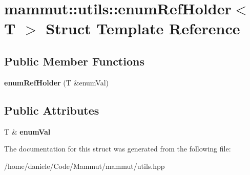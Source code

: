 \hypertarget{structmammut_1_1utils_1_1enumRefHolder}{\section{mammut\-:\-:utils\-:\-:enum\-Ref\-Holder$<$ T $>$ Struct Template Reference}
\label{structmammut_1_1utils_1_1enumRefHolder}
}
\subsection*{Public Member Functions}
\begin{DoxyCompactItemize}
\item 
\hypertarget{structmammut_1_1utils_1_1enumRefHolder_a767ffb8c1927f89e40ad83fb07e81029}{{\bfseries enum\-Ref\-Holder} (T \&enum\-Val)}\label{structmammut_1_1utils_1_1enumRefHolder_a767ffb8c1927f89e40ad83fb07e81029}

\end{DoxyCompactItemize}
\subsection*{Public Attributes}
\begin{DoxyCompactItemize}
\item 
\hypertarget{structmammut_1_1utils_1_1enumRefHolder_ae4f40e4a23be3930a6bee62240a8ffc6}{T \& {\bfseries enum\-Val}}\label{structmammut_1_1utils_1_1enumRefHolder_ae4f40e4a23be3930a6bee62240a8ffc6}

\end{DoxyCompactItemize}


The documentation for this struct was generated from the following file\-:\begin{DoxyCompactItemize}
\item 
/home/daniele/\-Code/\-Mammut/mammut/utils.\-hpp\end{DoxyCompactItemize}
